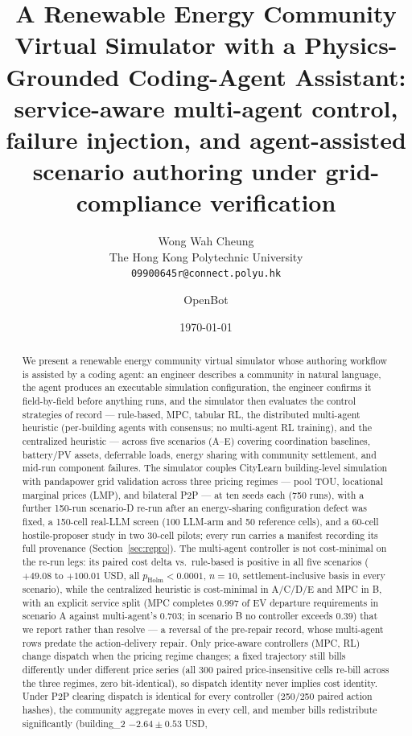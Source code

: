 \documentclass[11pt,a4paper]{article}
\title{A Renewable Energy Community Virtual Simulator with a Physics-Grounded Coding-Agent Assistant:\\ service-aware multi-agent control, failure injection, and agent-assisted scenario authoring under grid-compliance verification}
\author{
    Wong Wah Cheung \\
    The Hong Kong Polytechnic University \\
    \texttt{09900645r@connect.polyu.hk}
    \and
    OpenBot
}
\date{\today}
\begin{document}
\maketitle

\begin{abstract}
We present a renewable energy community virtual simulator whose authoring
workflow is assisted by a coding agent: an engineer describes a community in
natural language, the agent produces an executable simulation configuration,
the engineer confirms it field-by-field before anything runs, and the
simulator then evaluates the control strategies of record --- rule-based,
MPC, tabular RL, the distributed multi-agent heuristic (per-building agents
with consensus; no multi-agent RL training), and the centralized heuristic ---
across five scenarios (A--E) covering coordination baselines, battery/PV
assets, deferrable loads, energy sharing with community settlement, and
mid-run component failures. The simulator couples CityLearn building-level
simulation with pandapower grid validation across three pricing regimes ---
pool TOU, locational marginal prices (LMP), and bilateral P2P --- at ten
seeds each (750 runs), with a further 150-run scenario-D re-run after an
energy-sharing configuration defect was fixed, a 150-cell real-LLM screen
(100 LLM-arm and 50 reference cells), and a 60-cell hostile-proposer study
in two 30-cell pilots; every run carries a manifest recording its full
provenance (Section~\ref{sec:repro}). The multi-agent controller is not cost-minimal on the re-run legs: its paired
cost delta vs.\ rule-based is positive in all five scenarios ($+49.08$ to
$+100.01$ USD, all $p_{\mathrm{Holm}} < 0.0001$, $n{=}10$, settlement-inclusive
basis in every scenario), while the centralized heuristic is cost-minimal in
A/C/D/E and MPC in B, with an explicit service split (MPC completes $0.997$ of
EV departure requirements in scenario A against multi-agent's $0.703$; in
scenario B no controller exceeds $0.39$) that we report rather than
resolve --- a reversal of the pre-repair record, whose multi-agent rows
predate the action-delivery repair. Only price-aware
controllers (MPC, RL) change dispatch when the pricing regime changes; a
fixed trajectory still bills differently under different price series (all
300 paired price-insensitive cells re-bill across the three regimes, zero
bit-identical), so dispatch identity never implies cost identity. Under P2P
clearing dispatch is identical for every controller (250/250 paired action
hashes), the community aggregate moves in every cell, and member bills
redistribute significantly (building\_2 $-2.64 \pm 0.53$ USD,

\end{abstract}
\end{document}
